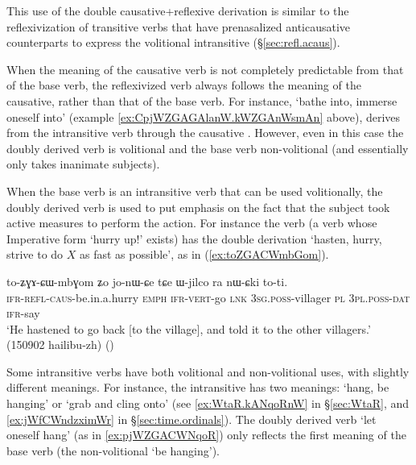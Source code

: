 This use of the double causative+reflexive derivation is similar to the reflexivization of transitive verbs that have prenasalized anticausative counterparts to express the volitional intransitive (§\ref {sec:refl.acaus}).

When the meaning of the causative verb is not completely predictable from that of the base verb, the reflexivized verb always follows the meaning of the causative, rather than that of the base verb. For instance,  `bathe into, immerse oneself into' (example \ref{ex:CpjWZGAGAlanW.kWZGAnWsmAn} above), derives from the intransitive verb  through the causative . However, even in this case the doubly derived verb  is volitional and the base verb   non-volitional (and essentially only takes inanimate subjects).

When the base verb is an intransitive verb that can be used volitionally, the doubly derived verb is used to put emphasis on the fact that the subject took active measures to perform the action. For instance  the verb  (a verb whose Imperative form  `hurry up!' exists) has the double derivation  `hasten, hurry, strive to do $X$ as fast as possible', as in (\ref{ex:toZGACWmbGom}).

\begin{exe}
\ex \label{ex:toZGACWmbGom}
\gll to-ʑɣɤ-ɕɯ-mbɣom ʑo jo-nɯ-ɕe tɕe ɯ-jilco ra nɯ-ɕki to-ti. \\
\textsc{ifr}-\textsc{refl}-\textsc{caus}-be.in.a.hurry \textsc{emph} \textsc{ifr}-\textsc{vert}-go \textsc{lnk} \textsc{3sg}.\textsc{poss}-villager \textsc{pl} \textsc{3pl}.\textsc{poss}-\textsc{dat} \textsc{ifr}-say \\
\glt `He hastened to go back [to the village], and told it to the other villagers.' (150902 hailibu-zh) ()
\end{exe}

Some intransitive verbs have both volitional and non-volitional uses, with slightly different meanings. For instance, the intransitive  has two meanings: `hang, be hanging' or `grab and cling onto' (see \ref{ex:WtaR.kANqoRnW} in §\ref{sec:WtaR}, and \ref{ex:jWfCWndzximWr} in §\ref{sec:time.ordinals}). The doubly derived verb  `let oneself hang' (as in \ref{ex:pjWZGACWNqoR}) only reflects the first meaning of the base verb  (the non-volitional `be hanging').

